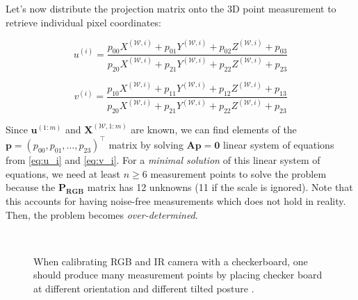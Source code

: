 \documentclass[a4paper]{report}
\numberwithin{figure}{section}
\begin{document}
Let's now distribute the projection matrix onto the 3D point measurement to 
retrieve individual pixel coordinates:

\begin{equation}\label{eq:u_i}
  u^{(i)} = 
  \frac
  {p_{00}X^{(\mathcal{W}, i)} + p_{01}Y^{(\mathcal{W}, i)} + 
  p_{02}Z^{(\mathcal{W}, i)} + p_{03}}
  {p_{20}X^{(\mathcal{W}, i)} + p_{21}Y^{(\mathcal{W}, i)} + 
  p_{22}Z^{(\mathcal{W}, i)} + p_{23}}
\end{equation} 

\begin{equation}\label{eq:v_i}
  v^{(i)} = 
  \frac
  {p_{10}X^{(\mathcal{W}, i)} + p_{11}Y^{(\mathcal{W}, i)} + 
  p_{12}Z^{(\mathcal{W}, i)} + p_{13}}
  {p_{20}X^{(\mathcal{W}, i)} + p_{21}Y^{(\mathcal{W}, i)} + 
  p_{22}Z^{(\mathcal{W}, i)} + p_{23}}
\end{equation} 


Since $\mathbf{u}^{(1:m)}$ and $\mathbf{X}^{(\mathcal{W}, 1:m)}$ are known, we 
can 
find 
elements of the 
$\mathbf{p} = (p_{00}, p_{01}, \dots, p_{23})^\top$ matrix by solving 
$\mathbf{Ap=0}$ linear system of equations from \eqref{eq:u_i} and 
\eqref{eq:v_i}.  
For a \textit{minimal solution} of this linear system of equations, we need at 
least $n \geq 6$ measurement points to solve the problem because the 
$\mathbf{P_{RGB}}$ matrix has 12 unknowns (11 if the scale is ignored).  Note 
that 
this accounts for having noise-free measurements which does not hold in 
reality. Then, the problem becomes \textit{over-determined}.

\begin{figure}[H]
\centering
{} \\
\caption[Checkboard Calibration for RGB and IR Camera]{When calibrating RGB 
and IR camera with a checkerboard, one should produce many measurement points 
by placing checker board at different orientation and different tilted 
posture \parencite{Karan2015}.}
\label{fig:checkerboard_rgb_ir}
\end{figure}
\end{document}
